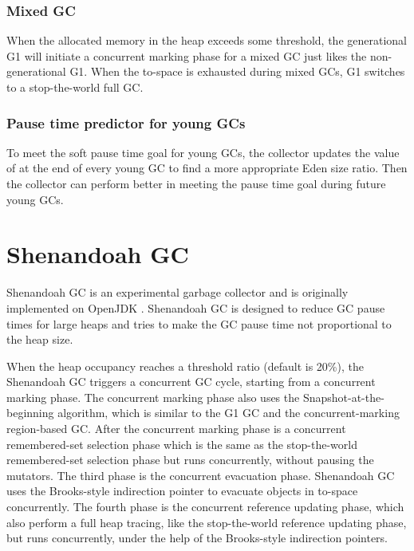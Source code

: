 \subsubsection{Mixed GC}

When the allocated memory in the heap exceeds some threshold, the generational G1 will
initiate a concurrent marking phase for a mixed GC just likes the non-generational G1.
When the to-space is exhausted during mixed GCs, G1 switches to a stop-the-world full GC.

\subsubsection{Pause time predictor for young GCs}

To meet the soft pause time goal for young GCs, the collector updates the value of 
at the end of every young GC to find a more appropriate Eden size ratio.
Then the collector can perform better in meeting the pause time goal during future young GCs.
 
\section{Shenandoah GC}
\label{sec:shenandoahgc}

Shenandoah GC is an experimental garbage collector and is originally implemented on OpenJDK \citep{flood2016shenandoah}.
Shenandoah GC is designed to reduce GC pause times for large heaps and tries to make the GC pause
time not proportional to the heap size.
 
When the heap occupancy reaches a threshold ratio (default is 20\%), the Shenandoah GC triggers
a concurrent GC cycle, starting from a concurrent marking phase.
The concurrent marking phase also uses the Snapshot-at-the-beginning algorithm,
which is similar to the G1 GC and the concurrent-marking region-based GC.
After the concurrent marking phase is a concurrent remembered-set selection phase
which is the same as the stop-the-world remembered-set selection phase
but runs concurrently, without pausing the mutators.
The third phase is the concurrent evacuation phase. Shenandoah GC uses the Brooks-style
indirection pointer \citep{flood2016shenandoah, brooks1984trading} to evacuate objects in to-space
concurrently. The fourth phase is the concurrent reference updating phase, which
also perform a full heap tracing, like the stop-the-world reference updating phase,
but runs concurrently, under the help of the Brooks-style indirection pointers.

